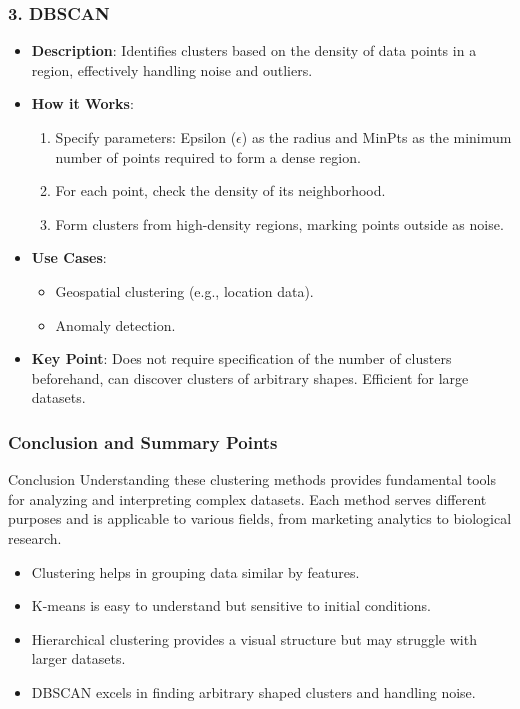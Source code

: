 \documentclass[aspectratio=169]{beamer}
\begin{document}
\begin{frame}[fragile]
    \frametitle{3. DBSCAN}
    \begin{itemize}
        \item \textbf{Description}: Identifies clusters based on the density of data points in a region, effectively handling noise and outliers.
        \item \textbf{How it Works}:
        \begin{enumerate}
            \item Specify parameters: Epsilon ($\epsilon$) as the radius and MinPts as the minimum number of points required to form a dense region.
            \item For each point, check the density of its neighborhood.
            \item Form clusters from high-density regions, marking points outside as noise.
        \end{enumerate}
        \item \textbf{Use Cases}:
        \begin{itemize}
            \item Geospatial clustering (e.g., location data).
            \item Anomaly detection.
        \end{itemize}
        \item \textbf{Key Point}: Does not require specification of the number of clusters beforehand, can discover clusters of arbitrary shapes. Efficient for large datasets.
    \end{itemize}
\end{frame}

\begin{frame}[fragile]
    \frametitle{Conclusion and Summary Points}
    \begin{block}{Conclusion}
        Understanding these clustering methods provides fundamental tools for analyzing and interpreting complex datasets. Each method serves different purposes and is applicable to various fields, from marketing analytics to biological research.
    \end{block}
    \begin{itemize}
        \item Clustering helps in grouping data similar by features.
        \item K-means is easy to understand but sensitive to initial conditions.
        \item Hierarchical clustering provides a visual structure but may struggle with larger datasets.
        \item DBSCAN excels in finding arbitrary shaped clusters and handling noise.
    \end{itemize}
\end{frame}
\end{document}
